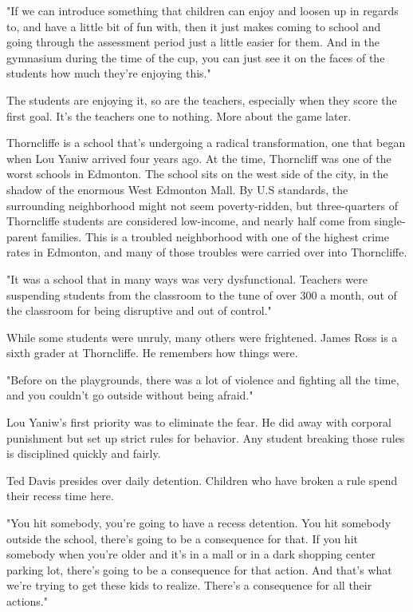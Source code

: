"If we can introduce something that children can enjoy and loosen up in regards to, and have a little bit of fun with, then it just makes coming to school and going through the assessment period just a little easier for them. And in the gymnasium during the time of the cup, you can just see it on the faces of the students how much they're enjoying this."

The students are enjoying it, so are the teachers, especially when they score the first goal. It's the teachers one to nothing. More about the game later.

Thorncliffe is a school that's undergoing a radical transformation, one that began when Lou Yaniw arrived four years ago. At the time, Thorncliff was one of the worst schools in Edmonton. The school sits on the west side of the city, in the shadow of the enormous West Edmonton Mall. By U.S standards, the surrounding neighborhood might not seem poverty-ridden, but three-quarters of Thorncliffe students are considered low-income, and nearly half come from single-parent families. This is a troubled neighborhood with one of the highest crime rates in Edmonton, and many of those troubles were carried over into Thorncliffe.

"It was a school that in many ways was very dysfunctional. Teachers were suspending students from the classroom to the tune of over 300 a month, out of the classroom for being disruptive and out of control."

While some students were unruly, many others were frightened. James Ross is a sixth grader at Thorncliffe. He remembers how things were.

"Before on the playgrounds, there was a lot of violence and fighting all the time, and you couldn't go outside without being afraid."

Lou Yaniw's first priority was to eliminate the fear. He did away with corporal punishment but set up strict rules for behavior. Any student breaking those rules is disciplined quickly and fairly.

Ted Davis presides over daily detention. Children who have broken a rule spend their recess time here.

"You hit somebody, you're going to have a recess detention. You hit somebody outside the school, there's going to be a consequence for that. If you hit somebody when you're older and it's in a mall or in a dark shopping center parking lot, there's going to be a consequence for that action. And that's what we're trying to get these kids to realize. There's a consequence for all their actions."

